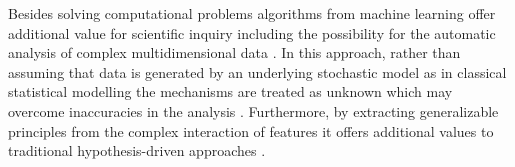 Besides solving computational problems algorithms from machine learning offer additional value for scientific inquiry including the possibility for the automatic analysis of complex multidimensional data \cite{Brunton2019,Breiman2001}. In this approach, rather than assuming that data is generated by an underlying stochastic model as in classical statistical modelling the mechanisms are treated as unknown which may overcome inaccuracies in the analysis \cite{Breiman2001}. Furthermore, by extracting generalizable principles from the complex interaction of features it offers additional values to traditional hypothesis-driven approaches \cite{Vu1601,Bzdok2017}.\\



